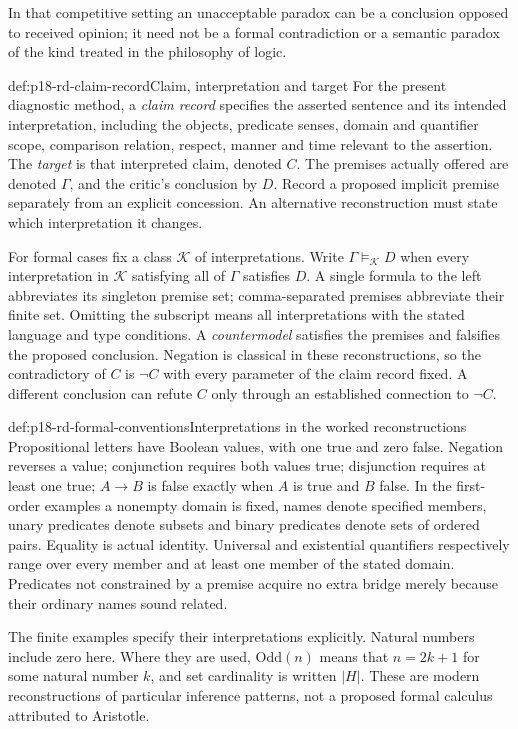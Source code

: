 In that competitive setting an unacceptable paradox can be a conclusion
opposed to received opinion; it need not be a formal contradiction or
a semantic paradox of the kind treated in the philosophy of logic.

\begin{hbdefinition}{def:p18-rd-claim-record}{Claim, interpretation and target}
For the present diagnostic method, a \emph{claim record} specifies the
asserted sentence and its intended interpretation, including the objects,
predicate senses, domain and quantifier scope, comparison relation,
respect, manner and time relevant to the assertion. The \emph{target}
is that interpreted claim, denoted \(C\). The premises actually
offered are denoted \(\Gamma\), and the critic's conclusion by \(D\).
Record a proposed implicit premise separately from an explicit concession.
An alternative reconstruction must state which interpretation it changes.

For formal cases fix a class \(\mathcal K\) of interpretations.
Write \(\Gamma\models_{\mathcal K}D\) when every interpretation
in \(\mathcal K\) satisfying all of \(\Gamma\) satisfies \(D\).
A single formula to the left abbreviates its singleton premise set;
comma-separated premises abbreviate their finite set. Omitting the
subscript means all interpretations with the stated language and type
conditions.
A \emph{countermodel} satisfies the premises and falsifies the proposed
conclusion. Negation is classical in these reconstructions, so the
contradictory of \(C\) is \(\neg C\) with every parameter of
the claim record fixed. A different conclusion can refute \(C\)
only through an established connection to \(\neg C\).
\end{hbdefinition}

\begin{hbconvention}{def:p18-rd-formal-conventions}{Interpretations in the worked reconstructions}
Propositional letters have Boolean values, with one true and zero false.
Negation reverses a value;
conjunction requires both values true; disjunction requires at least
one true; \(A\to B\) is false exactly when \(A\) is true and
\(B\) false. In the first-order examples a nonempty domain is fixed,
names denote specified members, unary predicates denote subsets and
binary predicates denote sets of ordered pairs. Equality is actual
identity. Universal and existential quantifiers respectively range over
every member and at least one member of the stated domain. Predicates
not constrained by a premise acquire no extra bridge merely because
their ordinary names sound related.

The finite examples specify their interpretations explicitly. Natural
numbers include zero here. Where they are used, \(\mathrm{Odd}(n)\) means that
\(n=2k+1\) for some natural number \(k\), and set cardinality is
written \(|H|\). These are modern reconstructions of particular
inference patterns, not a proposed formal calculus attributed to Aristotle.
\end{hbconvention}

